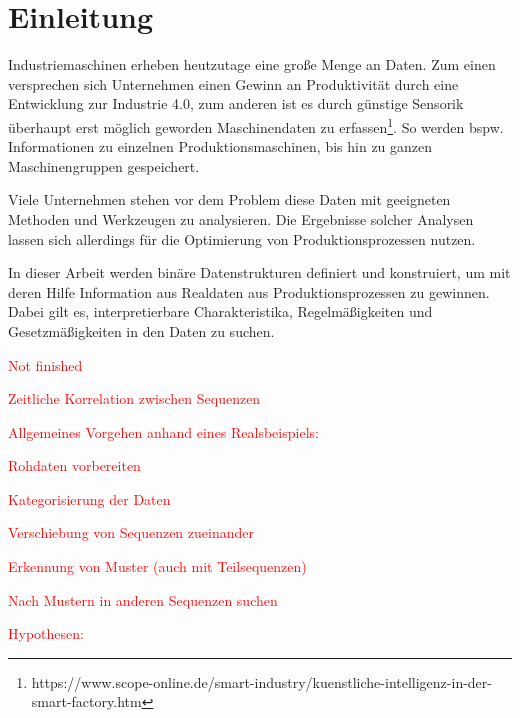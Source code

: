\chapter{Einleitung}
\label{chp:introduction}
Industriemaschinen erheben heutzutage eine große Menge an Daten.  Zum einen versprechen sich Unternehmen einen Gewinn an Produktivität durch eine Entwicklung zur Industrie 4.0, zum anderen ist es durch günstige Sensorik überhaupt erst möglich geworden Maschinendaten zu erfassen\footnote{https://www.scope-online.de/smart-industry/kuenstliche-intelligenz-in-der-smart-factory.htm}. So werden bspw. Informationen zu einzelnen Produktionsmaschinen, bis hin zu ganzen Maschinengruppen gespeichert.
 
Viele Unternehmen stehen vor dem Problem diese Daten mit geeigneten Methoden und Werkzeugen zu analysieren. Die Ergebnisse solcher Analysen lassen sich allerdings für die Optimierung von Produktionsprozessen nutzen.

In dieser Arbeit werden binäre Datenstrukturen definiert und konstruiert, um mit deren Hilfe Information aus Realdaten aus Produktionsprozessen zu gewinnen. Dabei gilt es, interpretierbare Charakteristika, Regelmäßigkeiten und Gesetzmäßigkeiten in den Daten zu suchen.

\textcolor{red}{Not finished}

\textcolor{red}{Zeitliche Korrelation zwischen Sequenzen}

\textcolor{red}{
	Allgemeines Vorgehen anhand eines Realsbeispiels:
	\begin{list}{}{}
		\item Rohdaten vorbereiten
		\item Kategorisierung der Daten 
		\item Verschiebung von Sequenzen zueinander
		\item Erkennung von Muster (auch mit Teilsequenzen)
		\item Nach Mustern in anderen Sequenzen suchen
	\end{list}
}

\textcolor{red}{
	Hypothesen:
	\begin{list}{}{}
		\item  
	\end{list}
}